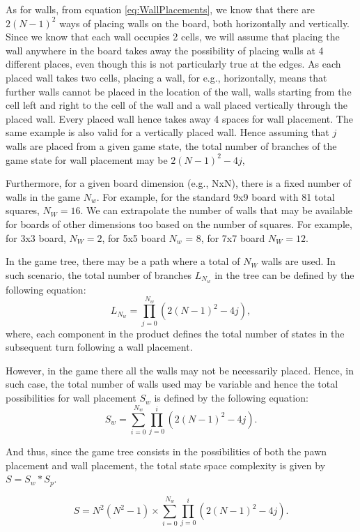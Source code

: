 As for walls, from equation \ref{eq:WallPlacements}, we know that there are $2(N-1)^2$ ways of placing walls on the board, both horizontally and vertically. Since we know that each wall occupies 2 cells, we will assume that placing the wall anywhere in the board takes away the possibility of placing walls at 4 different places, even though this is not particularly true at the edges. As each placed wall takes two cells, placing a wall, for e.g., horizontally, means that further walls cannot be placed in the location of the wall, walls starting from the cell left and right to the cell of the wall and a wall placed vertically through the placed wall. Every placed wall hence takes away 4 spaces for wall placement. The same example is also valid for a vertically placed wall. Hence assuming that $j$ walls are placed from a given game state, the total number of branches of the game state for wall placement may be $2(N-1)^2 - 4j$,

Furthermore, for a given board dimension (e.g., NxN), there is a fixed number of walls in the game $N_w$. For example, for the standard 9x9 board with 81 total squares, $N_W = 16$. We can extrapolate the number of walls that may be available for boards of other dimensions too based on the number of squares. For example, for 3x3 board, $N_W = 2$, for 5x5 board $N_w$ = 8, for 7x7 board $N_W = 12$.

In the game tree, there may be a path where a total of $N_W$ walls are used. In such scenario, the total number of branches $L_{N_w}$ in the tree can be defined by the following equation:
\begin{equation}
    L_{N_w} = \prod_{j=0}^{N_w} (2(N-1)^2 - 4j),
\end{equation}
where, each component in the product defines the total number of states in the subsequent turn following a wall placement.

However, in the game there all the walls may not be necessarily placed. Hence, in such case, the total number of walls used may be variable and hence the total possibilities for wall placement $S_w$ is defined by the following equation:
\begin{equation}
    S_w = \sum_{i=0}^{N_w}\prod_{j=0}^{i}(2(N-1)^2 - 4j).
\end{equation}

And thus, since the game tree consists in the possibilities of both the pawn placement and wall placement, the total state space complexity is given by $S = S_w * S_p$.

\begin{equation}
    S = N^2(N^2 -1) \times \sum_{i=0}^{N_w}\prod_{j=0}^{i}(2(N-1)^2 - 4j).
\end{equation}

